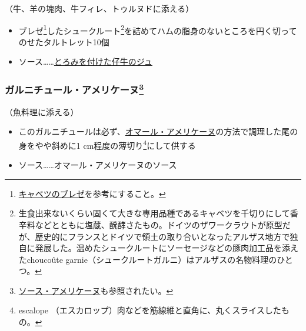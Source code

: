\begin{recette}


（牛、羊の塊肉、牛フィレ、トゥルヌドに添える）

\begin{itemize}
\item
  ブレゼ\footnote{\protect\hyperlink{chou-braise}{キャベツのブレゼ}を参考にすること。}したシュークルート\footnote{生食出来ないくらい固くて大きな専用品種であるキャベツを千切りにして香辛料などとともに塩蔵、醗酵さたもの。ドイツのザワークラウトが原型だが、歴史的にフランスとドイツで領土の取り合いとなったアルザス地方で独自に発展した。温めたシュークルートにソーセージなどの豚肉加工品を添えたchoucoûte
    garnie（シュークルートガルニ）はアルザスの名物料理のひとつ。}を詰めてハムの脂身のないところを円く切ってのせたタルトレット10個
\item
  ソース\ldots{}\ldots{}\protect\hyperlink{jus-de-veau-lie}{とろみを付けた仔牛のジュ}
\end{itemize}

\hypertarget{garniture-americaine}{%
\subsubsection[ガルニチュール・アメリケーヌ]{\texorpdfstring{ガルニチュール・アメリケーヌ\footnote{\protect\hyperlink{sauce-americaine}{ソース・アメリケーヌ}も参照されたい。}}{ガルニチュール・アメリケーヌ}}\label{garniture-americaine}}



（魚料理に添える）

\begin{itemize}
\item
  このガルニチュールは必ず、\protect\hyperlink{homard-americaine}{オマール・アメリケーヌ}の方法で調理した尾の身をやや斜めに1
  cm程度の薄切り\footnote{escalope
    （エスカロップ）肉などを筋線維と直角に、丸くスライスしたもの。}にして供する
\item
  ソース\ldots{}\ldots{}オマール・アメリケーヌのソース
\end{itemize}


\end{recette}
